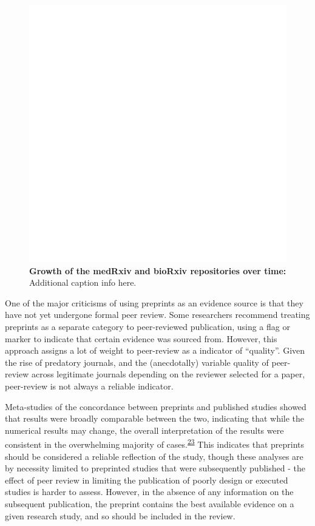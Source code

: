\documentclass[a4paper, twoside]{templates/ociamthesis}
\begin{document}
\begin{figure}
\includegraphics[width=1\linewidth]{figures/sys-rev/prismaflow} \caption[Growth of the medRxiv and bioRxiv repositories over time]{\textbf{Growth of the medRxiv and bioRxiv repositories over time:} Additional caption info here.}\label{fig:medrxiv-growth}
\end{figure}

One of the major criticisms of using preprints as an evidence source is that they have not yet undergone formal peer review. Some researchers recommend treating preprints as a separate category to peer-reviewed publication, using a flag or marker to indicate that certain evidence was sourced from. However, this approach assigns a lot of weight to peer-review as a indicator of ``quality''. Given the rise of predatory journals, and the (anecdotally) variable quality of peer-review across legitimate journals depending on the reviewer selected for a paper, peer-review is not always a reliable indicator.

Meta-studies of the concordance between preprints and published studies showed that results were broadly comparable between the two, indicating that while the numerical results may change, the overall interpretation of the results were consistent in the overwhelming majority of cases.\textsuperscript{\protect\hyperlink{ref-shi2021a}{23}} This indicates that preprints should be considered a reliable reflection of the study, though these analyses are by necessity limited to preprinted studies that were subsequently published - the effect of peer review in limiting the publication of poorly design or executed studies is harder to assess. However, in the absence of any information on the subsequent publication, the preprint contains the best available evidence on a given research study, and so should be included in the review.
\end{document}
